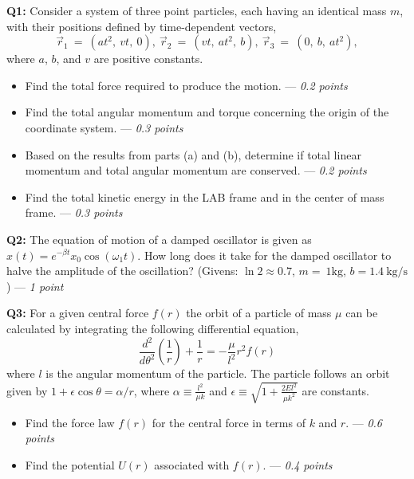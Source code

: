 \documentclass[a4paper,12pt]{article}
\begin{document}
\textbf{Q1:} Consider a system of three point particles, each having an identical mass $m$, with their positions defined by time-dependent vectors,
\begin{equation*}
    \vec r_{1}~=~(at^2,~vt,~0),~\vec r_{2}~=~(vt,~at^2,~b),~\vec r_{3}~=~(0,~b,~at^2), 
\end{equation*}
where $a$, $b$, and $v$ are positive constants.
\begin{itemize}
    \item[\textbf{a.}] Find the total force required to produce the motion. --- \textit{0.2 points}
    \item[\textbf{b.}] Find the total angular momentum and torque concerning the origin of the coordinate system. --- \textit{0.3 points}
    \item[\textbf{c.}] Based on the results from parts (a) and (b), determine if total linear momentum and total angular momentum are conserved. --- \textit{0.2 points}
    \item[\textbf{d.}] Find the total kinetic energy in the LAB frame and in the center of mass frame. --- \textit{0.3 points}
\end{itemize}

\vspace*{0.2cm}
\textbf{Q2:} The equation of motion of a damped oscillator is given as $x(t)=e^{-\beta t}x_0\cos{\left(\omega_1 t\right)}$. How long does it take for the damped oscillator to halve the amplitude of the oscillation? 
(Givens: $\ln2\approx 0.7$, $m=~1\text{kg}$, $b=1.4~\text{kg/s}$) --- \textit{1 point}

\vspace*{0.2cm}
\textbf{Q3:} For a given central force $f(r)$ the orbit of a particle of mass $\mu$ can be calculated by integrating the following differential equation,
\begin{equation*}
    \dfrac{d^2}{d\theta^2}\left(\frac{1}{r}\right)+\frac{1}{r}=-\frac{\mu}{l^2}r^2f(r)
\end{equation*}
where $l$ is the angular momentum of the particle. The particle follows an orbit given by $1+\epsilon\cos\theta=\alpha/r$, where $\alpha\equiv \frac{l^2}{\mu k}$ and $\epsilon \equiv \sqrt{1+\frac{2El^2}{\mu k^2}}$ are constants.

\begin{itemize}
    \item[\textbf{a.}] Find the force law $f(r)$ for the central force in terms of $k$ and $r$. --- \textit{0.6 points}
    \item[\textbf{b.}] Find the potential $U(r)$ associated with $f(r)$. --- \textit{0.4 points}
\end{itemize}
\end{document}
